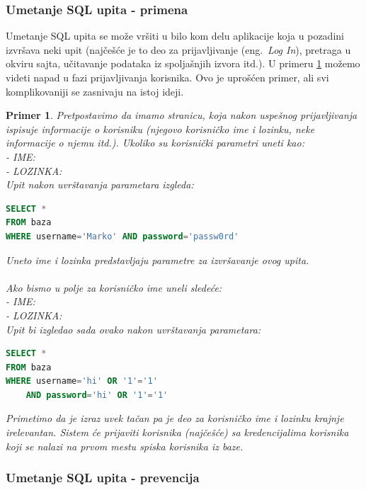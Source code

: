 \documentclass[a4paper]{article}
\newtheorem{primer}{Primer}[section]
\begin{document}
\subsubsection{Umetanje SQL upita - primena}

Umetanje SQL upita se može vršiti u bilo kom delu aplikacije koja u pozadini izvršava neki upit (najčešće je to deo za prijavljivanje (eng.~{\em Log In}), pretraga u okviru sajta, učitavanje podataka iz spoljašnjih izvora itd.). U primeru \ref{primer2} možemo videti napad u fazi prijavljivanja korisnika. Ovo je uprošćen primer, ali svi komplikovaniji se zasnivaju na istoj ideji.
\begin{primer}
\label{primer2}
Pretpostavimo da imamo stranicu, koja nakon uspešnog prijavljivanja ispisuje informacije o korisniku (njegovo korisničko ime i lozinku, neke informacije o njemu itd.). Ukoliko su korisnički parametri uneti kao:\\
- IME: \\
- LOZINKA: \\
Upit nakon uvrštavanja parametara izgleda:

\begin{lstlisting}[language=SQL]
SELECT * 
FROM baza 
WHERE username='Marko' AND password='passw0rd'
\end{lstlisting}
Uneto ime i lozinka predstavljaju parametre za izvršavanje ovog upita.\\\\
Ako bismo u polje za korisničko ime uneli sledeće:\\
- IME: \\
- LOZINKA: \\
Upit bi izgledao sada ovako nakon uvrštavanja parametara:

\begin{lstlisting}[language=SQL]
SELECT * 
FROM baza 
WHERE username='hi' OR '1'='1' 
	AND password='hi' OR '1'='1'
\end{lstlisting}

Primetimo da je izraz  uvek tačan pa je deo za korisničko ime i lozinku krajnje irelevantan.
Sistem će prijaviti korisnika (najčešće) sa kredencijalima korisnika koji se nalazi na prvom mestu spiska korisnika iz baze.\\
\end{primer}

\subsubsection{Umetanje SQL upita - prevencija}
\end{document}
